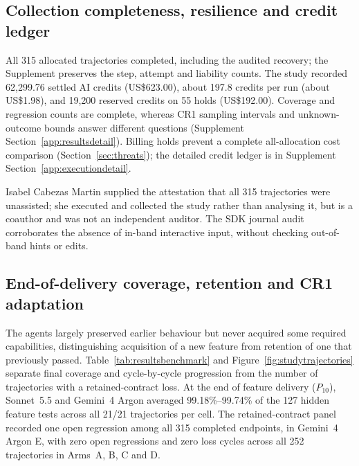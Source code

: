 \FloatBarrier
\subsection{Collection completeness, resilience and credit ledger}\label{sec:resultsledger}

All 315 allocated trajectories completed, including the audited recovery;
the Supplement preserves the step, attempt and liability counts.
The study recorded 62,299.76 settled AI credits (US\$623.00), about
197.8 credits per run (about US\$1.98), and 19,200 reserved credits on
55 holds (US\$192.00).
Coverage and regression counts are complete, whereas CR1 sampling
intervals and unknown-outcome bounds answer different questions
(Supplement Section~\ref{app:resultsdetail}).
Billing holds prevent a complete all-allocation cost comparison
(Section~\ref{sec:threats}); the detailed credit ledger is in Supplement
Section~\ref{app:executiondetail}.

Isabel Cabezas Martin supplied the attestation that all 315 trajectories were
unassisted; she executed and collected the study rather than analysing it,
but is a coauthor and was not an independent auditor. The SDK journal audit corroborates the absence of in-band interactive input, without checking out-of-band hints or edits.

\subsection{End-of-delivery coverage, retention and CR1 adaptation}\label{sec:resultscorrectness}

The agents largely preserved earlier behaviour but never acquired some required capabilities, distinguishing acquisition of a new feature from retention of one that previously passed.
Table~\ref{tab:resultsbenchmark} and
Figure~\ref{fig:studytrajectories} separate final coverage and
cycle-by-cycle progression from the number of trajectories with a
retained-contract loss. At the end of feature delivery ($P_{10}$),
Sonnet~5.5 and Gemini~4 Argon averaged 99.18\%--99.74\% of the 127 hidden
feature tests across all 21/21 trajectories per cell. The retained-contract
panel recorded one open regression among all 315 completed endpoints, in
Gemini~4 Argon E, with
zero open regressions and zero loss cycles across all 252 trajectories in
Arms~A, B, C and D.

